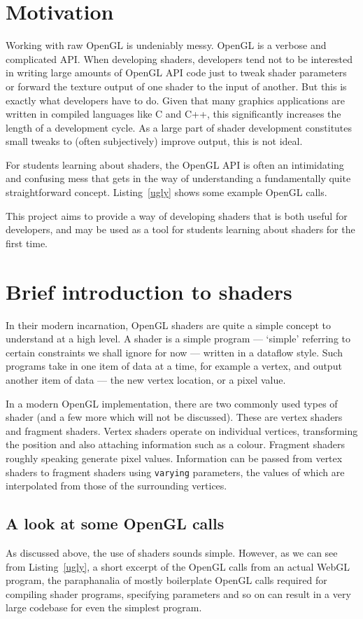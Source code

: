 \documentclass[12pt,twoside,notitlepage]{report}
\begin{document}
\section{Motivation}
Working with raw OpenGL is undeniably messy. OpenGL is a verbose and complicated API. When developing shaders, developers tend not to be interested in writing large amounts of OpenGL API code just to tweak shader parameters or forward the texture output of one shader to the input of another. But this is exactly what developers have to do. Given that many graphics applications are written in compiled languages like C and C++, this significantly increases the length of a development cycle. As a large part of shader development constitutes small tweaks to (often subjectively) improve output, this is not ideal.

For students learning about shaders, the OpenGL API is often an intimidating and confusing mess that gets in the way of understanding a fundamentally quite straightforward concept. Listing~\ref{ugly} shows some example OpenGL calls.

This project aims to provide a way of developing shaders that is both useful for developers, and may be used as a tool for students learning about shaders for the first time.
\section{Brief introduction to shaders}
\label{brief}
In their modern incarnation, OpenGL shaders are quite a simple concept to understand at a high level. A shader is a simple program --- `simple' referring to certain constraints we shall ignore for now --- written in a dataflow style. Such programs take in one item of data at a time, for example a vertex, and output another item of data --- the new vertex location, or a pixel value.

In a modern OpenGL implementation, there are two commonly used types of shader (and a few more which will not be discussed). These are vertex shaders and fragment shaders. Vertex shaders operate on individual vertices, transforming the position and also attaching information such as a colour. Fragment shaders roughly speaking generate pixel values. Information can be passed from vertex shaders to fragment shaders using \texttt{varying} parameters, the values of which are interpolated from those of the surrounding vertices.

\subsection{A look at some OpenGL calls}
As discussed above, the use of shaders sounds simple. However, as we can see from Listing~\ref{ugly}, a short excerpt of the OpenGL calls from an actual WebGL program\citet{reaction-diffusion}, the paraphanalia of mostly boilerplate OpenGL calls required for compiling shader programs, specifying parameters and so on can result in a very large codebase for even the simplest program.
\end{document}
